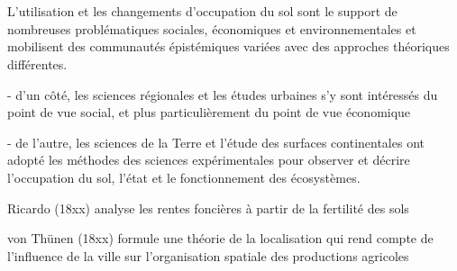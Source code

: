 \section{}

L'utilisation et les changements d'occupation du sol
sont le support de nombreuses problématiques sociales,
économiques et environnementales
et mobilisent des communautés épistémiques variées
avec des approches théoriques différentes.

- d'un côté, les sciences régionales et les études urbaines
  s'y sont intéressés du point de vue social,
  et plus particulièrement du point de vue économique

- de l'autre, les sciences de la Terre et l'étude des surfaces continentales
  ont adopté les méthodes des sciences expérimentales
  pour observer et décrire l'occupation du sol,
  l'état et le fonctionnement des écosystèmes.

Ricardo (18xx) analyse les rentes foncières à partir
de la fertilité des sols

von Thünen (18xx) formule une théorie de la localisation
qui rend compte de l'influence de la ville
sur l'organisation spatiale des productions agricoles